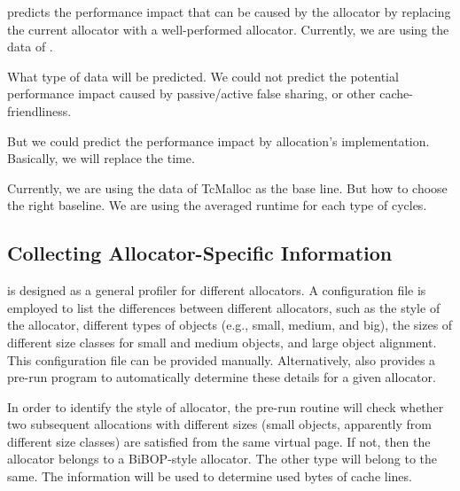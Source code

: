 \MP{} predicts the performance impact that can be caused by the allocator by replacing the current allocator with a well-performed allocator. Currently, we are using the data of . 



What type of data will be predicted. We could not predict the potential performance impact caused by passive/active false sharing, or other cache-friendliness. 

But we could predict the performance impact by allocation's implementation. Basically, we will replace the time. 


Currently, we are using the data of TcMalloc as the base line. But how to choose the right baseline. We are using the averaged runtime for each type of cycles. 




\subsection{Collecting Allocator-Specific Information}
\label{sec:understandingallocators}

\MP{} is designed as a general profiler for different allocators. A configuration file is employed to list the differences between different allocators, such as the style of the allocator, different types of objects (e.g., small, medium, and big), the sizes of different size classes for small and medium objects, and large object alignment. This configuration file can be provided manually. Alternatively, \MP{} also provides a pre-run program to automatically determine these details for a given allocator.

In order to identify the style of allocator, the pre-run routine will check whether two subsequent allocations with different sizes (small objects, apparently from different size classes) are satisfied from the same virtual page. If not, then the allocator belongs to a BiBOP-style allocator. The other type will belong to the same. The information will be used to determine used bytes of cache lines. 

